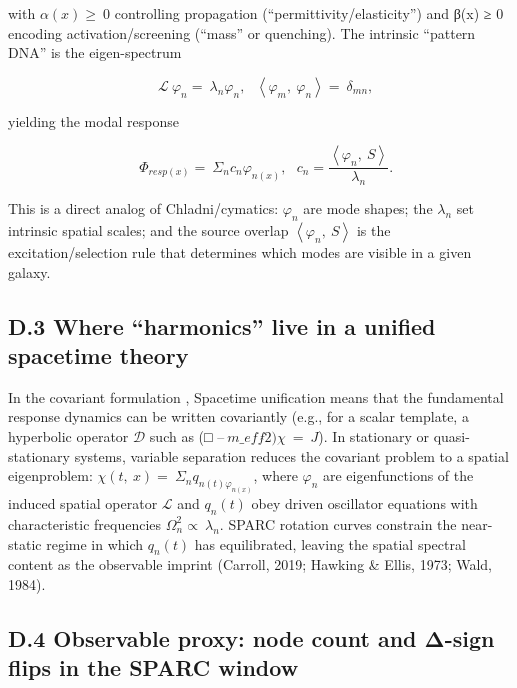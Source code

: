 \documentclass[11pt]{article}
\begin{document}
with \(\alpha(x) \geq \ 0\) controlling propagation (``permittivity/elasticity'') and β(x) ≥ 0 encoding activation/screening (``mass'' or quenching). The intrinsic ``pattern DNA'' is the eigen-spectrum

\[\ \ \ \ \mathcal{L}\ \varphi_{n} = \ \lambda_{n}\varphi_{n},\ \ \ \left\langle \varphi_{m},\ \varphi_{n} \right\rangle = \ \delta_{mn},\]

yielding the modal response

\[\ \ \ \ \Phi_{resp(x)} = \ \Sigma_{n}c_{n}\varphi_{n(x)},\ \ \ c_{n} = \frac{\left\langle \varphi_{n},\ S \right\rangle}{\lambda_{n}}.\]

This is a direct analog of Chladni/cymatics: \(\varphi_{n}\) are mode shapes; the \(\lambda_{n}\) set intrinsic spatial scales; and the source overlap \(\left\langle \varphi_{n},\ S \right\rangle\) is the excitation/selection rule that determines which modes are visible in a given galaxy.

\subsection{D.3 Where ``harmonics'' live in a unified spacetime theory}\label{d.3-where-harmonics-live-in-a-unified-spacetime-theory}

In the covariant formulation \citep{HawkingEllis1973, Wald1984GR, Carroll2019Spacetime}, Spacetime unification means that the fundamental response dynamics can be written covariantly (e.g., for a scalar template, a hyperbolic operator \(\mathcal{D}\) such as (□ \(–\ m\_ eff\hat{}2)\chi\  = \ J\)). In stationary or quasi-stationary systems, variable separation reduces the covariant problem to a spatial eigenproblem: \(\chi(t,\ x) = \ \Sigma_{n}q_{n(t)\varphi_{n(x)}}\), where \(\varphi_{n}\) are eigenfunctions of the induced spatial operator \(\mathcal{L}\) and \(q_{n}(t)\) obey driven oscillator equations with characteristic frequencies \(\Omega_{n}^{2} \propto \ \lambda_{n}\). SPARC rotation curves constrain the near-static regime in which \(q_{n}(t)\) has equilibrated, leaving the spatial spectral content as the observable imprint (Carroll, 2019; Hawking \& Ellis, 1973; Wald, 1984).

\subsection{D.4 Observable proxy: node count and Δ-sign flips in the SPARC window}\label{d.4-observable-proxy-node-count-and-ux3b4-sign-flips-in-the-sparc-window}
\end{document}
